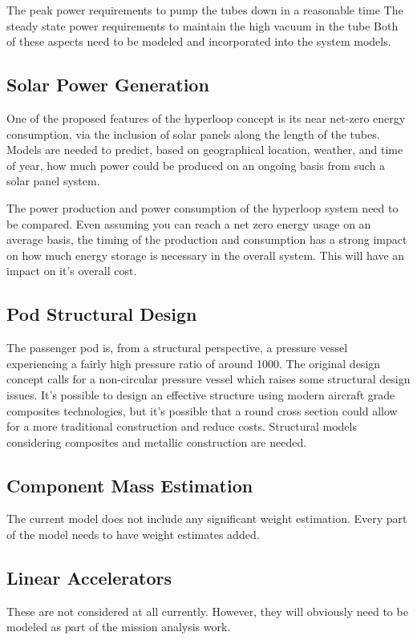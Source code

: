 \documentclass[heading.tex]{subfiles}
\begin{document}
The peak power requirements to pump the tubes down in a reasonable time
The steady state power requirements to maintain the high vacuum in the tube
Both of these aspects need to be modeled and incorporated into the system models.


\subsection{Solar Power Generation}
One of the proposed features of the hyperloop concept is its near net-zero energy consumption, via the inclusion of solar panels along the
length of the tubes. Models are needed to predict, based on geographical location, weather, and time of year, how much power could be
produced on an ongoing basis from such a solar panel system.

The power production and power consumption of the hyperloop system need to be compared. Even assuming you can reach a net zero
energy usage on an average basis, the timing of the production and consumption has a strong impact on how much energy storage is
necessary in the overall system. This will have an impact on it's overall cost.

\subsection{Pod Structural Design}
The passenger pod is, from a structural perspective, a pressure vessel experiencing a fairly high pressure ratio of around 1000. The original
design concept calls for a non-circular pressure vessel which raises some structural design issues. It's possible to design an effective
structure using modern aircraft grade composites technologies, but it's possible that a round cross section could allow for a more
traditional construction and reduce costs. Structural models considering composites and metallic construction are needed.

\subsection{Component Mass Estimation}
The current model does not include any significant weight estimation. Every part of the model needs to have weight estimates added.

\subsection{Linear Accelerators}
These are not considered at all currently. However, they will obviously need to be modeled as part of the mission analysis work.
\end{document}

